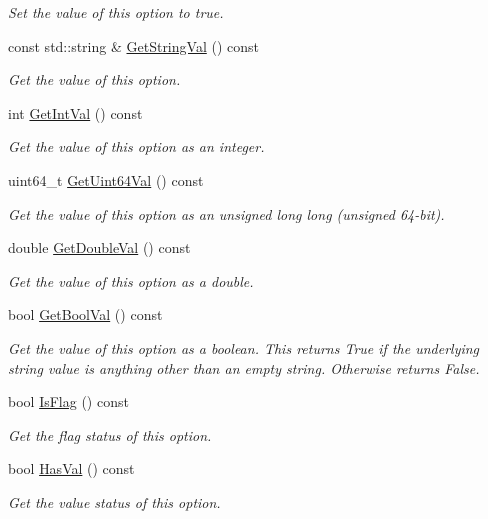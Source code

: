 \begin{DoxyCompactItemize}
\begin{DoxyCompactList}\small\item\em Set the value of this option to true. \end{DoxyCompactList}\item 
const std\+::string \& \hyperlink{classtool_1_1Option_a4d06e37da415d410a18e3facbb30abc3}{Get\+String\+Val} () const 
\begin{DoxyCompactList}\small\item\em Get the value of this option. \end{DoxyCompactList}\item 
int \hyperlink{classtool_1_1Option_a46701faf98e40b5f6a81fe0c86865b15}{Get\+Int\+Val} () const 
\begin{DoxyCompactList}\small\item\em Get the value of this option as an integer. \end{DoxyCompactList}\item 
uint64\+\_\+t \hyperlink{classtool_1_1Option_aeffb50df47db2627a232e8c04b0aeca3}{Get\+Uint64\+Val} () const 
\begin{DoxyCompactList}\small\item\em Get the value of this option as an unsigned long long (unsigned 64-\/bit). \end{DoxyCompactList}\item 
double \hyperlink{classtool_1_1Option_a2c259934e9cd770dfad1efb70a71c1f0}{Get\+Double\+Val} () const 
\begin{DoxyCompactList}\small\item\em Get the value of this option as a double. \end{DoxyCompactList}\item 
bool \hyperlink{classtool_1_1Option_ab7d08f16def63f9015d62dbfe06e628e}{Get\+Bool\+Val} () const 
\begin{DoxyCompactList}\small\item\em Get the value of this option as a boolean. This returns True if the underlying string value is anything other than an empty string. Otherwise returns False. \end{DoxyCompactList}\item 
bool \hyperlink{classtool_1_1Option_aceef342485d7f2b6c1308d7b04b1b1ea}{Is\+Flag} () const 
\begin{DoxyCompactList}\small\item\em Get the flag status of this option. \end{DoxyCompactList}\item 
bool \hyperlink{classtool_1_1Option_aac9058af5de2dd1c1d73367e1430c9e9}{Has\+Val} () const 
\begin{DoxyCompactList}\small\item\em Get the value status of this option. \end{DoxyCompactList}\end{DoxyCompactItemize}

